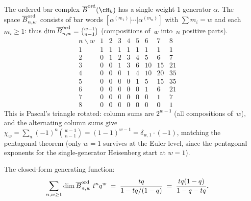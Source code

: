 \begin{computation}
\label{comp:heisenberg-dim-table}
The ordered bar complex $\Barchord(\cH_k)$ has
a single weight-$1$ generator $\alpha$. The space
$\overline{B}^{\mathrm{ord}}_{n,w}$ consists of bar words
$[\alpha^{(m_1)}|\cdots|\alpha^{(m_n)}]$ with
$\sum m_i=w$ and each $m_i\ge 1$: thus
$\dim\overline{B}^{\mathrm{ord}}_{n,w}=\binom{w-1}{n-1}$
(compositions of~$w$ into~$n$ positive parts).
\[
\renewcommand{\arraystretch}{1.05}
\begin{array}{r|rrrrrrrr}
n \backslash w & 1 & 2 & 3 & 4 & 5 & 6 & 7 & 8 \\
\hline
1 & 1 & 1 & 1 & 1 & 1 & 1 & 1 & 1 \\
2 & 0 & 1 & 2 & 3 & 4 & 5 & 6 & 7 \\
3 & 0 & 0 & 1 & 3 & 6 & 10 & 15 & 21 \\
4 & 0 & 0 & 0 & 1 & 4 & 10 & 20 & 35 \\
5 & 0 & 0 & 0 & 0 & 1 & 5 & 15 & 35 \\
6 & 0 & 0 & 0 & 0 & 0 & 1 & 6 & 21 \\
7 & 0 & 0 & 0 & 0 & 0 & 0 & 1 & 7 \\
8 & 0 & 0 & 0 & 0 & 0 & 0 & 0 & 1
\end{array}
\]
This is Pascal's triangle rotated: column sums are
$2^{w-1}$ (all compositions of~$w$), and the alternating
column sums give $\chi_w=\sum_n(-1)^n\binom{w-1}{n-1}
=(1-1)^{w-1}=\delta_{w,1}\cdot(-1)$, matching the
pentagonal theorem (only $w=1$ survives at the Euler
level, since the pentagonal exponents for the single-generator
Heisenberg start at $w=1$).

The closed-form generating function:
\begin{equation}\label{eq:heisenberg-bar-gf}
\sum_{n,w\ge 1}
\dim\overline{B}^{\mathrm{ord}}_{n,w}\;t^n q^w
\;=\;
\frac{tq}{1-tq/(1-q)}
\;=\;
\frac{tq(1-q)}{1-q-tq}.
\end{equation}
\end{computation}

